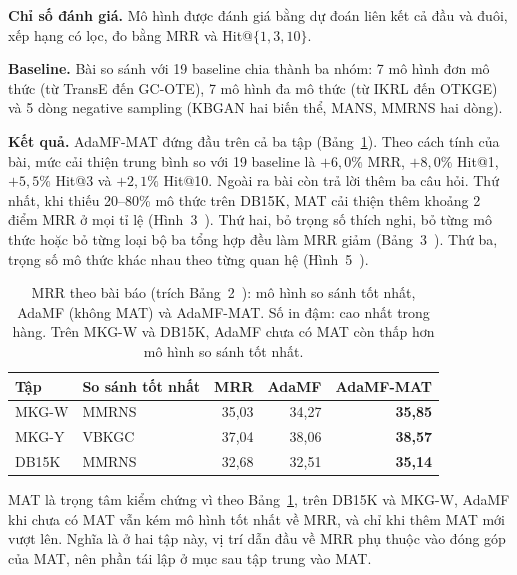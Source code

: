 \documentclass[conference]{IEEEtran}
\renewcommand{\hl}[1]{#1}
\renewcommand{\colorbox}[2]{#2}
\begin{document}
\textbf{\hl{Chỉ số đánh giá.}} \hl{Mô hình được đánh giá bằng dự đoán liên kết cả đầu và đuôi, xếp hạng có lọc, đo bằng
MRR và Hit@}\colorbox{yellow}{$\{1, 3, 10\}$}\hl{.}

\textbf{\hl{Baseline.}} \hl{Bài so sánh với 19 baseline chia thành ba nhóm: 7 mô hình đơn mô thức (từ TransE đến GC-OTE),
7 mô hình đa mô thức (từ IKRL đến OTKGE) và 5 dòng negative sampling (KBGAN hai biến thể, MANS, MMRNS hai dòng).}

\textbf{\hl{Kết quả.}} \hl{AdaMF-MAT đứng đầu trên cả ba tập (Bảng}\colorbox{yellow}{~\ref{tab:adamf-paper}}\hl{).
Theo cách tính của bài, mức cải thiện trung bình so với 19 baseline là}
\colorbox{yellow}{$+6{,}0\%$} \hl{MRR,} \colorbox{yellow}{$+8{,}0\%$} \hl{Hit@1,}
\colorbox{yellow}{$+5{,}5\%$} \hl{Hit@3 và} \colorbox{yellow}{$+2{,}1\%$} \hl{Hit@10.
Ngoài ra bài còn trả lời thêm ba câu hỏi. Thứ nhất, khi thiếu 20--80\% mô thức trên DB15K, MAT cải thiện thêm khoảng
2 điểm MRR ở mọi tỉ lệ (Hình~3}\colorbox{yellow}{~\cite{adamfmat}}\hl{). Thứ hai, bỏ trọng số thích nghi, bỏ từng mô thức
hoặc bỏ từng loại bộ ba tổng hợp đều làm MRR giảm (Bảng~3}\colorbox{yellow}{~\cite{adamfmat}}\hl{). Thứ ba, trọng số mô thức
khác nhau theo từng quan hệ (Hình~5}\colorbox{yellow}{~\cite{adamfmat}}\hl{).}

\begin{table}[t]
\caption{MRR theo bài báo (trích Bảng~2~\cite{adamfmat}): mô hình so sánh tốt nhất, AdaMF (không MAT) và AdaMF-MAT. Số in đậm: cao nhất trong hàng. Trên MKG-W và DB15K, AdaMF chưa có MAT còn thấp hơn mô hình so sánh tốt nhất.}
\label{tab:adamf-paper}
\centering\footnotesize
\setlength{\tabcolsep}{4pt}
\begin{tabular}{llrrr}
\toprule
Tập & So sánh tốt nhất & MRR & AdaMF & AdaMF-MAT \\
\midrule
MKG-W & MMRNS & 35,03 & 34,27 & \textbf{35,85} \\
MKG-Y & VBKGC & 37,04 & 38,06 & \textbf{38,57} \\
DB15K & MMRNS & 32,68 & 32,51 & \textbf{35,14} \\
\bottomrule
\end{tabular}
\end{table}

\hl{MAT là trọng tâm kiểm chứng vì theo Bảng}\colorbox{yellow}{~\ref{tab:adamf-paper}}\hl{, trên DB15K và MKG-W, AdaMF khi chưa có MAT
vẫn kém mô hình tốt nhất về MRR, và chỉ khi thêm MAT mới vượt lên. Nghĩa là ở hai tập này, vị trí dẫn đầu về MRR phụ
thuộc vào đóng góp của MAT, nên phần tái lập ở mục sau tập trung vào MAT.}
\end{document}

